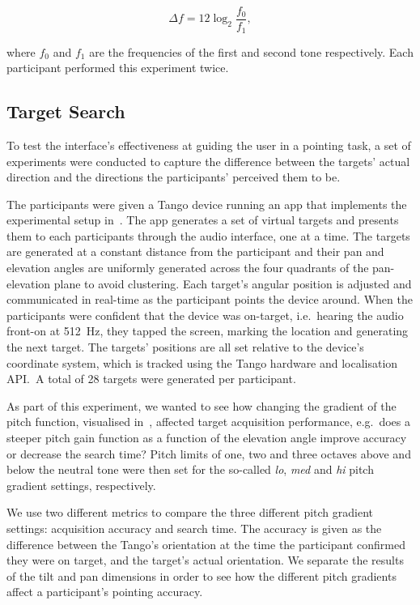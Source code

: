 \documentclass[]{interact}
\begin{document}
\begin{equation}
\label{eq:semitone-difference}
  \Delta f = 12\log_2\frac{f_0}{f_1}, 
\end{equation}

\noindent where $f_0$ and $f_1$ are the frequencies of the first and second tone respectively.
Each participant performed this experiment twice. 

\subsection{Target Search}\label{sec:target_search}

To test the interface's effectiveness at guiding the user in a pointing task, a set of experiments were conducted to capture the difference between the targets' actual direction and the directions the participants' perceived them to be.

The participants were given a Tango device running an app that implements the experimental setup in~. The app generates a set of virtual targets and presents them to each participants through the audio interface, one at a time. 
The targets are generated at a constant distance from the participant and their pan and elevation angles are uniformly generated across the four quadrants of the pan-elevation plane to avoid clustering.
Each target's angular position is adjusted and communicated in real-time as the participant points the device around. 
When the participants were confident that the device was on-target, i.e.~hearing the audio front-on at \SI{512}{\hertz}, they tapped the screen, marking the location and generating the next target.
The targets' positions are all set relative to the device's coordinate system, which is tracked using the Tango hardware and localisation API.\
A total of 28 targets were generated per participant. 

As part of this experiment, we wanted to see how changing the gradient of the pitch function, visualised in~, affected target acquisition performance, e.g.\ does a steeper pitch gain function as a function of the elevation angle improve accuracy or decrease the search time?
Pitch limits of one, two and three octaves above and below the neutral tone were then set for the so-called \textit{lo}, \textit{med} and \textit{hi} pitch gradient settings, respectively.

We use two different metrics to compare the three different pitch gradient settings: acquisition accuracy and search time.
The accuracy is given as the difference between the Tango's orientation at the time the participant confirmed they were on target, and the target's actual orientation.
We separate the results of the tilt and pan dimensions in order to see how the different pitch gradients affect a participant's pointing accuracy. 
\end{document}
